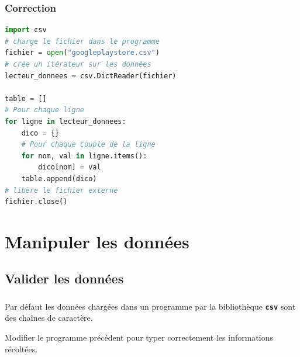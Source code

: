 \documentclass[svgnames,11pt]{beamer}
\begin{document}
\begin{frame}[fragile]
    \frametitle{Correction}

    \begin{center}
        \begin{lstlisting}[language=Python, basicstyle=\small]
import csv
# charge le fichier dans le programme
fichier = open("googleplaystore.csv")
# crée un itérateur sur les données
lecteur_donnees = csv.DictReader(fichier)

table = []
# Pour chaque ligne
for ligne in lecteur_donnees:
    dico = {}
    # Pour chaque couple de la ligne
    for nom, val in ligne.items():
        dico[nom] = val
    table.append(dico)
# libère le fichier externe
fichier.close()
\end{lstlisting}
        \label{CODE}
    \end{center}

\end{frame}

\section{Manipuler les données}
\subsection{Valider les données}
\begin{frame}
    \frametitle{}
    Par défaut les données chargées dans un programme par la bibliothèque \textbf{\texttt{csv}} sont des chaînes de caractère.
    \begin{activite}
        Modifier le programme précédent pour typer correctement les informations récoltées.
    \end{activite}
\end{frame}
\end{document}
